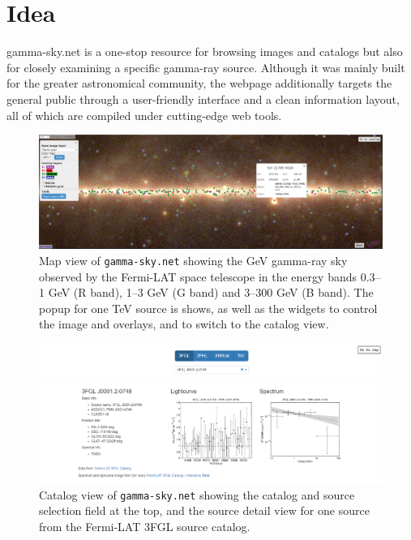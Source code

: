 \section{Idea}

gamma-sky.net is a one-stop resource for browsing images and catalogs but also for closely examining a specific gamma-ray source. Although it was mainly built for the greater astronomical community, the webpage additionally targets the general public through a user-friendly interface and a clean information layout, all of which are compiled under cutting-edge web tools.

\begin{figure}[t]
\centerline{\includegraphics[width=\textwidth]{figures/mapview_wide}}
\caption{Map view of \texttt{gamma-sky.net} showing the GeV gamma-ray sky observed by the Fermi-LAT space telescope in the energy bands 0.3--1 GeV (R band), 1--3 GeV (G band) and 3--300 GeV (B band). The popup for one TeV source is shows, as well as the widgets to control the image and overlays, and to switch to the catalog view.}
\label{fig:mapview}
\end{figure}

\begin{figure}[t]
\centerline{\includegraphics[width=\textwidth]{figures/catview_wide_zoom}}
\caption{Catalog view of \texttt{gamma-sky.net} showing the catalog and source selection field at the top, and the source detail view for one source from the Fermi-LAT 3FGL source catalog.}
\label{fig:catview}
\end{figure}

